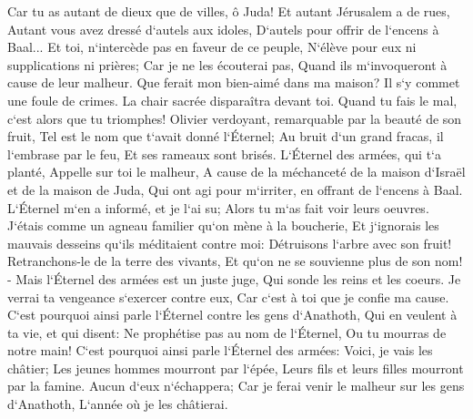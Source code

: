\verse Car tu as autant de dieux que de villes, ô Juda! Et autant Jérusalem a de rues, Autant vous avez dressé d`autels aux idoles, D`autels pour offrir de l`encens à Baal... 
\verse Et toi, n`intercède pas en faveur de ce peuple, N`élève pour eux ni supplications ni prières; Car je ne les écouterai pas, Quand ils m`invoqueront à cause de leur malheur. 
\verse Que ferait mon bien-aimé dans ma maison? Il s`y commet une foule de crimes. La chair sacrée disparaîtra devant toi. Quand tu fais le mal, c`est alors que tu triomphes! 
\verse Olivier verdoyant, remarquable par la beauté de son fruit, Tel est le nom que t`avait donné l`Éternel; Au bruit d`un grand fracas, il l`embrase par le feu, Et ses rameaux sont brisés. 
\verse L`Éternel des armées, qui t`a planté, Appelle sur toi le malheur, A cause de la méchanceté de la maison d`Israël et de la maison de Juda, Qui ont agi pour m`irriter, en offrant de l`encens à Baal. 
\verse L`Éternel m`en a informé, et je l`ai su; Alors tu m`as fait voir leurs oeuvres. 
\verse J`étais comme un agneau familier qu`on mène à la boucherie, Et j`ignorais les mauvais desseins qu`ils méditaient contre moi: Détruisons l`arbre avec son fruit! Retranchons-le de la terre des vivants, Et qu`on ne se souvienne plus de son nom! - 
\verse Mais l`Éternel des armées est un juste juge, Qui sonde les reins et les coeurs. Je verrai ta vengeance s`exercer contre eux, Car c`est à toi que je confie ma cause. 
\verse C`est pourquoi ainsi parle l`Éternel contre les gens d`Anathoth, Qui en veulent à ta vie, et qui disent: Ne prophétise pas au nom de l`Éternel, Ou tu mourras de notre main! 
\verse C`est pourquoi ainsi parle l`Éternel des armées: Voici, je vais les châtier; Les jeunes hommes mourront par l`épée, Leurs fils et leurs filles mourront par la famine. 
\verse Aucun d`eux n`échappera; Car je ferai venir le malheur sur les gens d`Anathoth, L`année où je les châtierai. 

